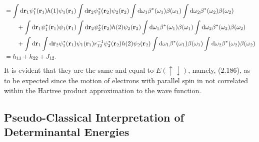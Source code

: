 \documentclass[a4paper]{book}
\newcounter{solution}[chapter]
\newcommand*{\dif}{\mathop{}\!\mathrm{d}}
\newcommand{\bfr}{{\bf r}}
\begin{document}
\begin{solution}
\begin{align*}
		&= \int \dif \bfr_1 \psi^*_1(\bfr_1) h(1) \psi_1(\bfr_1) \int \dif \bfr_2 \psi^*_2(\bfr_2) \psi_2(\bfr_2) \int \dif \omega_1 \beta^*(\omega_1) \beta(\omega_1) \int \dif \omega_2 \beta^*(\omega_2) \beta(\omega_2) \\
		&\hspace{2em} + \int \dif \bfr_1 \psi^*_1(\bfr_1) \psi_1(\bfr_1) \int \dif \bfr_2 \psi^*_2(\bfr_2) h(2) \psi_2(\bfr_2) \int \dif \omega_1 \beta^*(\omega_1) \beta(\omega_1) \int \dif \omega_2 \beta^*(\omega_2) \beta(\omega_2) \\
		&\hspace{2em} + \int \dif \bfr_1 \int \dif \bfr_2 \psi^*_1(\bfr_1) \psi_1(\bfr_1) r^{-1}_{12} \psi^*_2(\bfr_2) h(2) \psi_2(\bfr_2) \int \dif \omega_1 \beta^*(\omega_1) \beta(\omega_1) \int \dif \omega_2 \beta^*(\omega_2) \beta(\omega_2) \\
		&= h_{11} + h_{22} + J_{12} .
	\end{align*}
	It is evident that they are the same and equal to $E(\uparrow\downarrow)$, namely, (2.186), as to be expected since the motion of electrons with parallel spin in not correlated within the Hartree product approximation to the wave function.
	
	\end{solution}
	
	\subsection{Pseudo-Classical Interpretation of Determinantal Energies}
	
\end{document}
